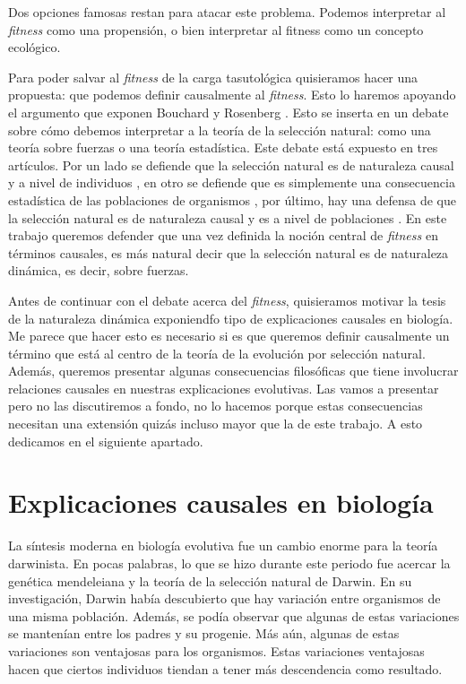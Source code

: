 Dos opciones famosas restan para atacar este problema. Podemos interpretar al \emph{fitness} como una propensión, o bien interpretar al fitness como un concepto ecológico. 

Para poder salvar al \emph{fitness} de la carga tasutológica quisieramos hacer una propuesta: que podemos definir causalmente al \emph{fitness}. Esto lo haremos apoyando el argumento que exponen Bouchard y Rosenberg \cite{Bouchard2004}.  Esto se inserta en un debate sobre cómo debemos interpretar a la teoría de la selección natural: como una teoría sobre fuerzas o una teoría estadística. Este debate está expuesto en tres artículos. Por un lado se defiende que la selección natural es de naturaleza causal y a nivel de individuos \cite{Bouchard2004}, en otro se defiende que es simplemente una consecuencia estadística de las poblaciones de organismos \cite{Walsh2002}, por último, hay una defensa de que la selección natural es de naturaleza causal y es a nivel de poblaciones \cite{Millstein2006}. En este trabajo queremos defender que una vez definida la noción central de \emph{fitness} en términos causales, es más natural decir que la selección natural es de naturaleza dinámica, es decir, sobre fuerzas.

Antes de continuar con el debate acerca del \emph{fitness}, quisieramos motivar la tesis de la naturaleza dinámica exponiendfo tipo de explicaciones causales en biología. Me parece que hacer esto es necesario si es que queremos definir causalmente un término que está al centro de la teoría de la evolución por selección natural. Además, queremos presentar algunas consecuencias filosóficas que tiene involucrar relaciones causales en nuestras explicaciones evolutivas. Las vamos a presentar pero no las discutiremos a fondo, no lo hacemos porque estas consecuencias necesitan una extensión quizás incluso mayor que la de este trabajo. A esto dedicamos en el siguiente apartado.

\section{Explicaciones causales en biología}

\noindent La síntesis moderna en biología evolutiva fue un cambio enorme para la teoría darwinista. En pocas palabras, lo que se hizo durante este periodo fue acercar la genética mendeleiana y la teoría de la selección natural de Darwin. En su investigación, Darwin había descubierto que hay variación entre organismos de una misma población. Además, se podía observar que algunas de estas variaciones se mantenían entre los padres y su progenie. Más aún, algunas de estas variaciones son ventajosas para los organismos. Estas variaciones ventajosas hacen que ciertos individuos tiendan a tener más descendencia como resultado.

